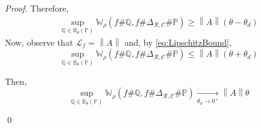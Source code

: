 \documentclass[10pt,a4paper]{amsart}
\def\bsC{{\bm{\mathcal{C}}}}
\def\bsR{{\bm{\mathcal{R}}}}
\def\probQ{\mathbb{Q}}
\def\prob{\mathbb{P}}
\def\sL{{\mathcal{L}}}
\def\wasserstein{{\mathbb{W}}}
\newcommand{\norm}[1]{\left\lVert#1\right\rVert}
\begin{document}
\begin{proof}
    Therefore,
    \begin{align*}
            \sup_{\probQ \in \mathbb{B}_{\theta}(\prob)} \wasserstein_\rho(f \# \probQ, f \# \Delta_{\bsR, \bsC}\#\prob) \geq \norm{A} (\theta-\theta_d)
        \end{align*}
    Now, observe that $\sL_f = \norm{A}$ and, by \eqref{eq:LipschitzBound}, 
    $$\sup_{\probQ \in \mathbb{B}_{\theta}(\prob)} \wasserstein_\rho(f \# \probQ, f \# \Delta_{\bsR, \bsC}\#\prob) \leq \norm{A} (\theta+\theta_d)$$
    
    Then,
    \begin{equation*}
        \sup_{\probQ \in \mathbb{B}_{\theta}(\prob)} \wasserstein_\rho(f \# \probQ, f \# \Delta_{\bsR, \bsC}\#\prob) \xrightarrow[\theta_d \to 0^+]{} \norm{A} \theta
    \end{equation*}
    
    \qed
    \end{proof}
\end{document}

